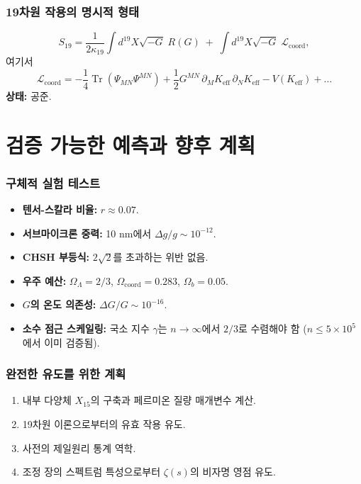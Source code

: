 \documentclass[11pt,a4paper]{article}
\DeclareMathOperator{\Tr}{Tr}
\newcommand{\coord}{\mathrm{coord}}
\begin{document}
	\section{19차원 작용의 명시적 형태}
	\label{sec:19Dlagrangian}
	\[
	S_{19} = \frac{1}{2\kappa_{19}} \int d^{19}X \sqrt{-G}\; R(G) \;+\; \int d^{19}X \sqrt{-G}\; \mathcal{L}_{\text{coord}},
	\]
	여기서
	\[
	\mathcal{L}_{\text{coord}} = -\frac{1}{4} \Tr(\Psi_{MN}\Psi^{MN}) + \frac{1}{2} G^{MN}\,\partial_M K_{\mathrm{eff}}\,\partial_N K_{\mathrm{eff}} - V(K_{\mathrm{eff}}) + \dots
	\]
	\textbf{상태:} 공준.
	
	\part{검증 가능한 예측과 향후 계획}
	
	\section{구체적 실험 테스트}
	\begin{itemize}
		\item \textbf{텐서-스칼라 비율:} \(r \approx 0.07\).
		\item \textbf{서브마이크론 중력:} 10 nm에서 \(\Delta g/g \sim 10^{-12}\).
		\item \textbf{CHSH 부등식:} \(2\sqrt{2}\)를 초과하는 위반 없음.
		\item \textbf{우주 예산:} \(\Omega_\Lambda = 2/3\), \(\Omega_{\coord} = 0.283\), \(\Omega_b = 0.05\).
		\item \textbf{\(G\)의 온도 의존성:} \(\Delta G/G \sim 10^{-16}\).
		\item \textbf{소수 점근 스케일링:} 국소 지수 \(\gamma\)는 \(n\to\infty\)에서 \(2/3\)로 수렴해야 함 (\(n\le 5\times10^5\)에서 이미 검증됨).
	\end{itemize}
	
	\section{완전한 유도를 위한 계획}
	\begin{enumerate}
		\item 내부 다양체 \(X_{15}\)의 구축과 페르미온 질량 매개변수 계산.
		\item 19차원 이론으로부터의 유효 작용 유도.
		\item 사전의 제일원리 통계 역학.
		\item 조정 장의 스펙트럼 특성으로부터 \(\zeta(s)\)의 비자명 영점 유도.
	\end{enumerate}
	
\end{document}
